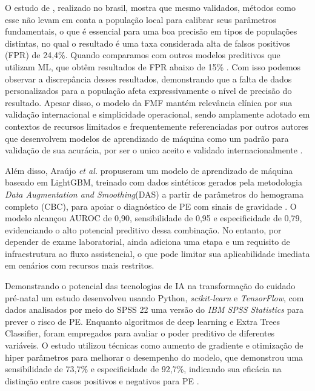 \documentclass[12pt, a4paper]{report}
\theoremstyle{definition}
\theoremstyle{remark}
\theoremstyle{plain}
\begin{document}
O estudo de \textcite{Rezende2024}, realizado no brasil, mostra que mesmo validados, métodos como esse não levam em conta a população local para calibrar seus parâmetros fundamentais, o que é essencial para uma boa precisão em tipos de populações distintas, no qual o resultado é uma taxa considerada alta de falsos positivos (FPR) de 24,4\%. Quando comparamos com outros modelos preditivos que utilizam ML, que obtêm resultados de FPR abaixo de 15\% \cite{Gil2024}. Com isso podemos observar a discrepância desses resultados, demonstrando que a falta de dados personalizados para a população afeta expressivamente o nível de precisão do resultado. Apesar disso, o modelo da FMF mantém relevância clínica por sua validação internacional e simplicidade operacional, sendo amplamente adotado em contextos de recursos limitados e frequentemente referenciadas por outros autores que desenvolvem modelos de aprendizado de máquina como um padrão para validação de sua acurácia, por ser o unico aceito e validado internacionalmente \cite{Torres-Torres}.

Além disso, Araújo \textit{et al.} propuseram um modelo de aprendizado de máquina baseado em LightGBM, treinado com dados sintéticos gerados pela metodologia \textit{Data Augmentation and Smoothing}(DAS) a partir de parâmetros do hemograma completo (CBC), para apoiar o diagnóstico de PE com sinais de gravidade \cite{Araujo2024}. O modelo alcançou AUROC de 0,90, sensibilidade de 0,95 e especificidade de 0,79, evidenciando o alto potencial preditivo dessa combinação. No entanto, por depender de exame laboratorial, ainda adiciona uma etapa e um requisito de infraestrutura ao fluxo assistencial, o que pode limitar sua aplicabilidade imediata em cenários com recursos mais restritos.

Demonstrando o potencial das tecnologias de IA na transformação do cuidado pré-natal um estudo desenvolveu usando Python, \textit{scikit-learn} e \textit{TensorFlow}, com dados analisados por meio do SPSS 22 uma versão do \textit{IBM SPSS Statistics} para prever o risco de PE. Enquanto algoritmos de deep learning e Extra Trees Classifier, foram empregados para avaliar o poder preditivo de diferentes variáveis. O estudo utilizou técnicas como aumento de gradiente e otimização de hiper parâmetros para melhorar o desempenho do modelo, que demonstrou uma sensibilidade de 73,7\% e especificidade de 92,7\%, indicando sua eficácia na distinção entre casos positivos e negativos para PE \cite{Bulez2024}.
\end{document}
